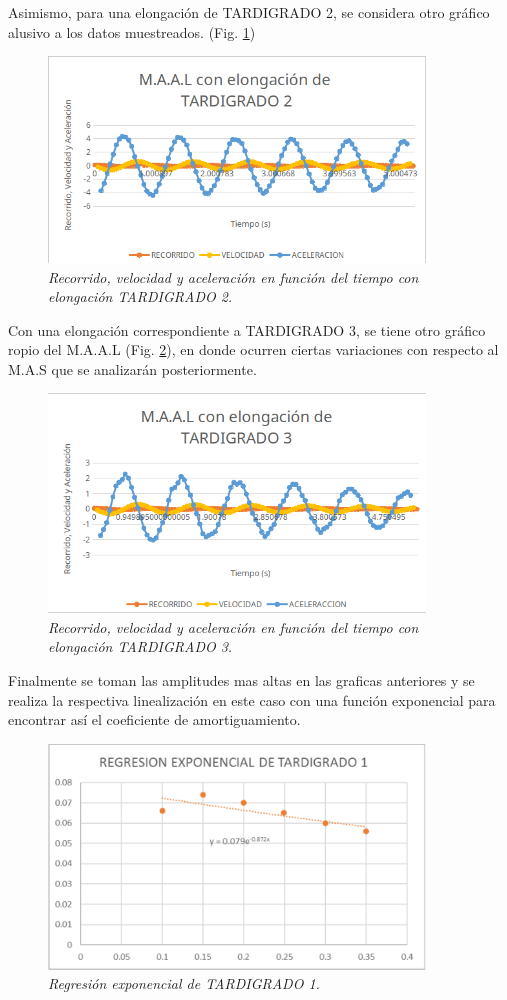 \documentclass[spanish,notitlepage,letterpaper, 12pt]{article}
\begin{document}
\bigskip
Asimismo, para una elongación de TARDIGRADO 2, se considera otro gráfico alusivo a los datos muestreados. (Fig. \ref{Figura 5})
\begin{figure}[h]
    \centering
    \includegraphics[width=10.0cm]{images/tardigrado2.png}
    \caption{\textit{Recorrido, velocidad y aceleración en función del tiempo con elongación TARDIGRADO 2.}}
    \label{Figura 5}
\end{figure}
\bigskip
Con una elongación correspondiente a TARDIGRADO 3, se tiene otro gráfico ropio del M.A.A.L (Fig. \ref{Figura 6}), en donde ocurren ciertas variaciones con respecto al M.A.S que se analizarán posteriormente.
\newpage
\begin{figure}[ht]
    \centering
    \includegraphics[width=10.0cm]{images/tardigrado3.png}
    \caption{\textit{Recorrido, velocidad y aceleración en función del tiempo con elongación TARDIGRADO 3.}}
    \label{Figura 6}
\end{figure}
Finalmente se toman las amplitudes mas altas en las graficas anteriores y se realiza la respectiva linealización en este caso con una función exponencial para encontrar así el coeficiente de amortiguamiento.
\begin{figure}[ht]
    \centering
    \includegraphics[width=10.0cm]{images/regresion-tardigrado1.png}
    \caption{\textit{Regresión exponencial de TARDIGRADO 1.}}
    \label{Figura 7}
\end{figure}
\end{document}
